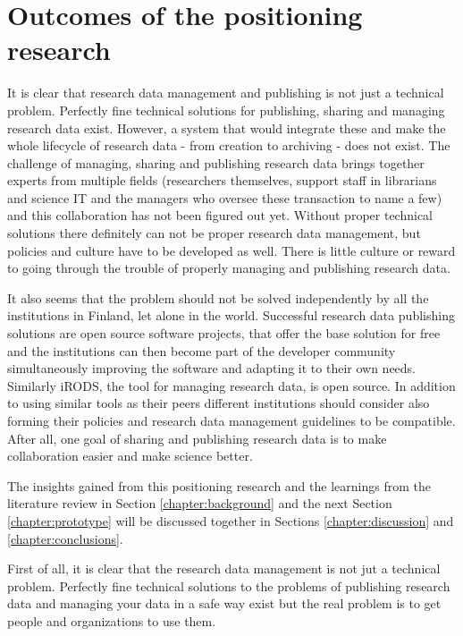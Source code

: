 \section{Outcomes of the positioning research}
\label{sec:positioning_outcomes}

It is clear that research data management and publishing is not just a
technical problem. Perfectly fine technical solutions for publishing, sharing
and managing research data exist. However, a system
that would integrate these and make the whole lifecycle of research data -
from creation to archiving - does not exist. The challenge
of managing, sharing and publishing research data brings together experts from
multiple fields (researchers themselves, support staff in librarians and
science IT and the managers who oversee these transaction to name a few) and
this collaboration has not been figured out yet. Without proper technical
solutions there definitely can not be proper research data management, but
policies and culture have to be developed as well. There is little culture or reward to
going through the trouble of properly managing and publishing research data.

It also seems that the problem should not be solved independently by all the
institutions in Finland, let alone in the world. Successful research data
publishing solutions are open source software projects, that offer the base
solution for free and the institutions can then become part of the developer
community simultaneously improving the software and adapting it to their own
needs. Similarly iRODS, the tool for managing research data, is open source. In
addition to using similar tools as their peers different institutions should
consider also forming their policies and research data management guidelines
to be compatible. After all, one goal of sharing and publishing research data
is to make collaboration easier and make science better.

The insights gained from this positioning research and the learnings from
the literature review in Section \ref{chapter:background} and the next Section
\ref{chapter:prototype} will be discussed together in Sections
\ref{chapter:discussion} and \ref{chapter:conclusions}.

\iffalse
First of all, it is clear that the research data management is not jut a
technical problem. Perfectly fine technical solutions to the problems of
publishing research data and managing your data in a safe way exist but the
real problem is to get people and organizations to use them.

